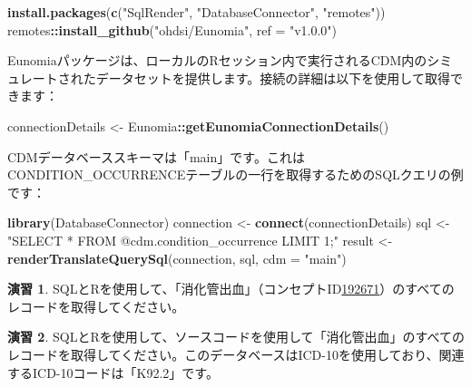 \documentclass[
  11pt]{book}
\newenvironment{Shaded}{\begin{snugshade}}{\end{snugshade}}
\newcommand{\AttributeTok}[1]{\textcolor[rgb]{0.13,0.29,0.53}{#1}}
\newcommand{\FunctionTok}[1]{\textcolor[rgb]{0.13,0.29,0.53}{\textbf{#1}}}
\newcommand{\NormalTok}[1]{#1}
\newcommand{\OtherTok}[1]{\textcolor[rgb]{0.56,0.35,0.01}{#1}}
\newcommand{\SpecialCharTok}[1]{\textcolor[rgb]{0.81,0.36,0.00}{\textbf{#1}}}
\newcommand{\StringTok}[1]{\textcolor[rgb]{0.31,0.60,0.02}{#1}}
\theoremstyle{definition}
\theoremstyle{definition}
\theoremstyle{definition}
\newtheorem{exercise}{演習}[chapter]
\theoremstyle{definition}
\theoremstyle{remark}
\begin{document}
\begin{Shaded}
\begin{Highlighting}[]
\FunctionTok{install.packages}\NormalTok{(}\FunctionTok{c}\NormalTok{(}\StringTok{"SqlRender"}\NormalTok{, }\StringTok{"DatabaseConnector"}\NormalTok{, }\StringTok{"remotes"}\NormalTok{))}
\NormalTok{remotes}\SpecialCharTok{::}\FunctionTok{install\_github}\NormalTok{(}\StringTok{"ohdsi/Eunomia"}\NormalTok{, }\AttributeTok{ref =} \StringTok{"v1.0.0"}\NormalTok{)}
\end{Highlighting}
\end{Shaded}

Eunomiaパッケージは、ローカルのRセッション内で実行されるCDM内のシミュレートされたデータセットを提供します。接続の詳細は以下を使用して取得できます：

\begin{Shaded}
\begin{Highlighting}[]
\NormalTok{connectionDetails }\OtherTok{\textless{}{-}}\NormalTok{ Eunomia}\SpecialCharTok{::}\FunctionTok{getEunomiaConnectionDetails}\NormalTok{()}
\end{Highlighting}
\end{Shaded}

CDMデータベーススキーマは「main」です。これはCONDITION\_OCCURRENCEテーブルの一行を取得するためのSQLクエリの例です：

\begin{Shaded}
\begin{Highlighting}[]
\FunctionTok{library}\NormalTok{(DatabaseConnector)}
\NormalTok{connection }\OtherTok{\textless{}{-}} \FunctionTok{connect}\NormalTok{(connectionDetails)}
\NormalTok{sql }\OtherTok{\textless{}{-}} \StringTok{"SELECT *}
\StringTok{FROM @cdm.condition\_occurrence}
\StringTok{LIMIT 1;"}
\NormalTok{result }\OtherTok{\textless{}{-}} \FunctionTok{renderTranslateQuerySql}\NormalTok{(connection, sql, }\AttributeTok{cdm =} \StringTok{"main"}\NormalTok{)}
\end{Highlighting}
\end{Shaded}

\begin{exercise}
\protect\hypertarget{exr:exerciseGiBleedRecords}{}\label{exr:exerciseGiBleedRecords}SQLとRを使用して、「消化管出血」（コンセプトID\href{http://athena.ohdsi.org/search-terms/terms/192671}{192671}）のすべてのレコードを取得してください。
\end{exercise}

\begin{exercise}
\protect\hypertarget{exr:exercisePersonSource}{}\label{exr:exercisePersonSource}SQLとRを使用して、ソースコードを使用して「消化管出血」のすべてのレコードを取得してください。このデータベースはICD-10を使用しており、関連するICD-10コードは「K92.2」です。
\end{exercise}
\end{document}

